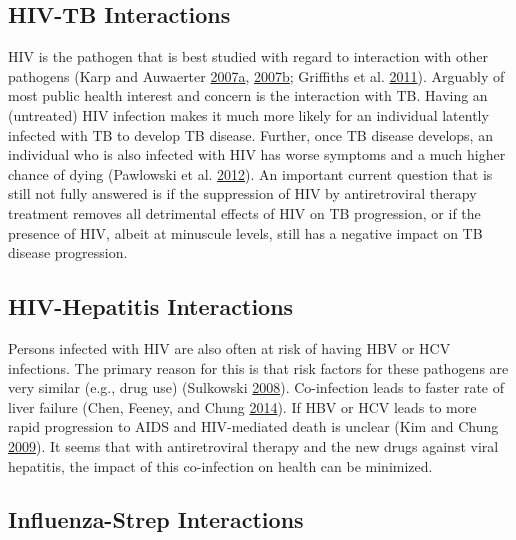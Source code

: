 \documentclass[
]{book}
\begin{document}
\hypertarget{hiv-tb-interactions}{%
\subsection{HIV-TB Interactions}\label{hiv-tb-interactions}}

HIV is the pathogen that is best studied with regard to interaction with other pathogens (Karp and Auwaerter \protect\hyperlink{ref-karp07}{2007}\protect\hyperlink{ref-karp07}{a}, \protect\hyperlink{ref-karp07a}{2007}\protect\hyperlink{ref-karp07a}{b}; Griffiths et al. \protect\hyperlink{ref-griffiths11}{2011}). Arguably of most public health interest and concern is the interaction with TB. Having an (untreated) HIV infection makes it much more likely for an individual latently infected with TB to develop TB disease. Further, once TB disease develops, an individual who is also infected with HIV has worse symptoms and a much higher chance of dying (Pawlowski et al. \protect\hyperlink{ref-pawlowski12}{2012}). An important current question that is still not fully answered is if the suppression of HIV by antiretroviral therapy treatment removes all detrimental effects of HIV on TB progression, or if the presence of HIV, albeit at minuscule levels, still has a negative impact on TB disease progression.

\hypertarget{hiv-hepatitis-interactions}{%
\subsection{HIV-Hepatitis Interactions}\label{hiv-hepatitis-interactions}}

Persons infected with HIV are also often at risk of having HBV or HCV infections. The primary reason for this is that risk factors for these pathogens are very similar (e.g., drug use) (Sulkowski \protect\hyperlink{ref-sulkowski08}{2008}). Co-infection leads to faster rate of liver failure (Chen, Feeney, and Chung \protect\hyperlink{ref-chen14}{2014}). If HBV or HCV leads to more rapid progression to AIDS and HIV-mediated death is unclear (Kim and Chung \protect\hyperlink{ref-kim09}{2009}). It seems that with antiretroviral therapy and the new drugs against viral hepatitis, the impact of this co-infection on health can be minimized.

\hypertarget{influenza-strep-interactions}{%
\subsection{Influenza-Strep Interactions}\label{influenza-strep-interactions}}
\end{document}
